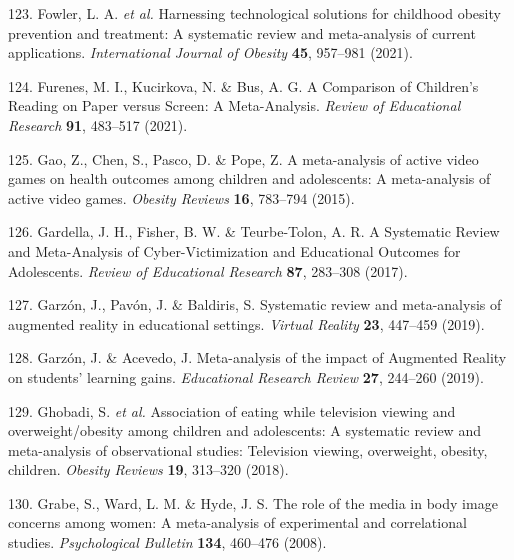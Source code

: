\documentclass[
  english,
  man]{apa6}
\newenvironment{cslreferences}%
  {}%
  {\par}
\begin{document}
\begin{cslreferences}
\leavevmode\hypertarget{ref-fowlerHarnessingTechnologicalSolutions2021}{}%
123. Fowler, L. A. \emph{et al.} Harnessing technological solutions for childhood obesity prevention and treatment: A systematic review and meta-analysis of current applications. \emph{International Journal of Obesity} \textbf{45}, 957--981 (2021).

\leavevmode\hypertarget{ref-furenesComparisonChildrenReading2021}{}%
124. Furenes, M. I., Kucirkova, N. \& Bus, A. G. A Comparison of Children's Reading on Paper versus Screen: A Meta-Analysis. \emph{Review of Educational Research} \textbf{91}, 483--517 (2021).

\leavevmode\hypertarget{ref-gaoMetaanalysisActiveVideo2015}{}%
125. Gao, Z., Chen, S., Pasco, D. \& Pope, Z. A meta-analysis of active video games on health outcomes among children and adolescents: A meta-analysis of active video games. \emph{Obesity Reviews} \textbf{16}, 783--794 (2015).

\leavevmode\hypertarget{ref-gardellaSystematicReviewMetaAnalysis2017}{}%
126. Gardella, J. H., Fisher, B. W. \& Teurbe-Tolon, A. R. A Systematic Review and Meta-Analysis of Cyber-Victimization and Educational Outcomes for Adolescents. \emph{Review of Educational Research} \textbf{87}, 283--308 (2017).

\leavevmode\hypertarget{ref-garzonSystematicReviewMetaanalysis2019}{}%
127. Garzón, J., Pavón, J. \& Baldiris, S. Systematic review and meta-analysis of augmented reality in educational settings. \emph{Virtual Reality} \textbf{23}, 447--459 (2019).

\leavevmode\hypertarget{ref-garzonMetaanalysisImpactAugmented2019}{}%
128. Garzón, J. \& Acevedo, J. Meta-analysis of the impact of Augmented Reality on students' learning gains. \emph{Educational Research Review} \textbf{27}, 244--260 (2019).

\leavevmode\hypertarget{ref-ghobadiAssociationEatingTelevision2018}{}%
129. Ghobadi, S. \emph{et al.} Association of eating while television viewing and overweight/obesity among children and adolescents: A systematic review and meta-analysis of observational studies: Television viewing, overweight, obesity, children. \emph{Obesity Reviews} \textbf{19}, 313--320 (2018).

\leavevmode\hypertarget{ref-grabeRoleMediaBody2008}{}%
130. Grabe, S., Ward, L. M. \& Hyde, J. S. The role of the media in body image concerns among women: A meta-analysis of experimental and correlational studies. \emph{Psychological Bulletin} \textbf{134}, 460--476 (2008).


\end{cslreferences}
\end{document}
